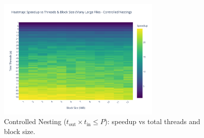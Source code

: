\documentclass[10pt]{article}
\newcommand{\code}[1]{\texttt{#1}}
\begin{document}
\begin{figure}[hbtp]
    \centering
    \includegraphics[width=0.7\textwidth]{../results/plots/many_large_parallel_right/speedup_matrix_many_large_right.pdf}
    \caption{Controlled Nesting ($t_{\text{out}}\times t_{\text{in}}\le P$): speedup vs total threads and block size.}
    \label{fig:many_large_ctrl}
\end{figure}

\end{document}
